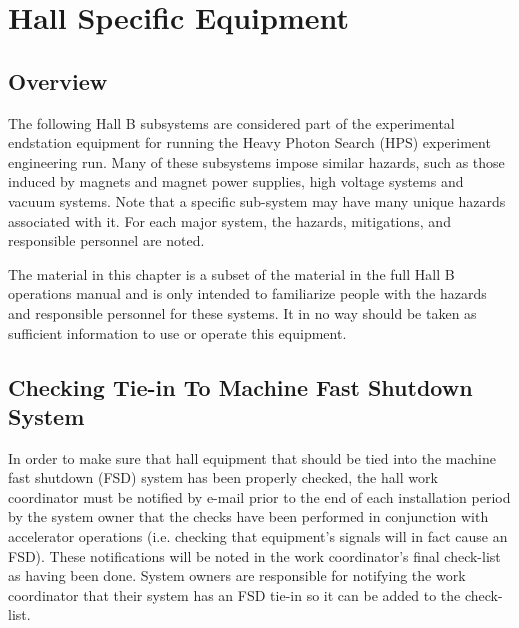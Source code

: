 %
%
\chapter{Hall Specific Equipment}

\section{Overview}


The following Hall B subsystems are considered part of the experimental endstation equipment for running the Heavy Photon Search (HPS) experiment engineering run.
Many of these subsystems impose similar hazards, such as those induced by magnets and magnet power supplies,
high voltage systems and vacuum systems.  Note that a specific sub-system may have many unique hazards associated with it.
For each major system, the hazards, mitigations, and responsible personnel are noted.

The material in this chapter is a subset of the material in the full Hall B operations manual and is only intended to familiarize
people with the hazards and responsible personnel for these systems.  It in no way should be taken as sufficient information to use or operate this equipment.

\section{Checking Tie-in To Machine Fast Shutdown System}
\indent

In order to make sure that hall equipment that should be tied into the machine fast shutdown (FSD) system
has been properly checked, the hall work coordinator must be notified by e-mail prior to the end of each
installation period by the system owner
that the checks have been performed in conjunction with accelerator operations (i.e. checking that equipment's signals
will in fact cause an FSD).  These notifications will be
noted in the work coordinator's final check-list as having been done.   System owners are responsible
for notifying the work coordinator that their system has an FSD tie-in so it can be added to the check-list.


%
%
